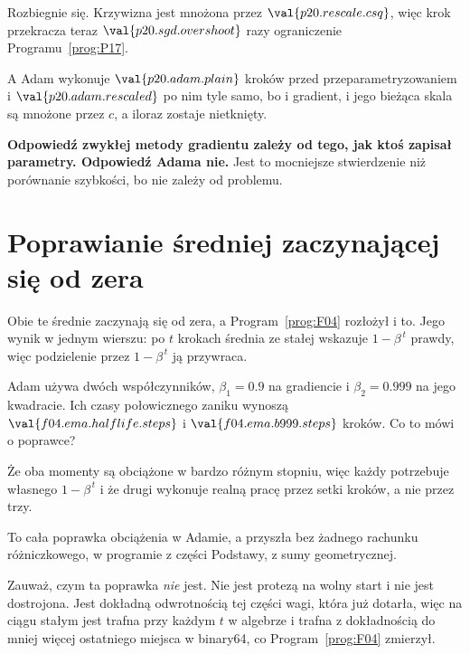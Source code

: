 \begin{fr}
\begin{ansblock}
Rozbiegnie się. Krzywizna jest mnożona przez $\val{p20.rescale.csq}$, więc krok
przekracza teraz $\val{p20.sgd.overshoot}$ razy ograniczenie
Programu~\ref{prog:P17}.
\end{ansblock}

A Adam wykonuje $\val{p20.adam.plain}$ kroków przed przeparametryzowaniem i
$\val{p20.adam.rescaled}$ po nim \dash{} tyle samo, bo i gradient, i jego
bieżąca skala są mnożone przez $c$, a iloraz zostaje nietknięty.

\textbf{Odpowiedź zwykłej metody gradientu zależy od tego, jak ktoś zapisał
parametry. Odpowiedź Adama nie.} Jest to mocniejsze stwierdzenie niż porównanie
szybkości, bo nie zależy od problemu.
\end{fr}

\section{Poprawianie średniej zaczynającej się od zera}
\label{sec:P20-bias}

\begin{fr}
Obie te średnie zaczynają się od zera, a Program~\ref{prog:F04} rozłożył i to.
Jego wynik w jednym wierszu: po $t$ krokach średnia ze stałej wskazuje
$1 - \beta^{\,t}$ prawdy, więc podzielenie przez $1 - \beta^{\,t}$ ją
przywraca.

Adam używa dwóch współczynników, $\beta_1 = \num{0.9}$ na gradiencie i
$\beta_2 = \num{0.999}$ na jego kwadracie. Ich czasy połowicznego zaniku wynoszą
$\val{f04.ema.halflife.steps}$ i $\val{f04.ema.b999.steps}$ kroków. Co to mówi
o poprawce?
\dotline
\nextframe
\end{fr}

\begin{fr}
\begin{ansblock}
Że oba momenty są obciążone w bardzo różnym stopniu, więc każdy potrzebuje
własnego $1 - \beta^{\,t}$ \dash{} i że drugi wykonuje realną pracę przez setki
kroków, a nie przez trzy.
\end{ansblock}

To cała poprawka obciążenia w Adamie, a przyszła bez żadnego rachunku
różniczkowego, w programie z części Podstawy, z sumy geometrycznej.

\begin{note}
Zauważ, czym ta poprawka \emph{nie} jest. Nie jest protezą na wolny start i nie
jest dostrojona. Jest dokładną odwrotnością tej części wagi, która już dotarła,
więc na ciągu stałym jest trafna przy każdym $t$ w algebrze \dash{} i trafna z
dokładnością do mniej więcej ostatniego miejsca w binary64, co
Program~\ref{prog:F04} zmierzył.
\end{note}
\end{fr}

